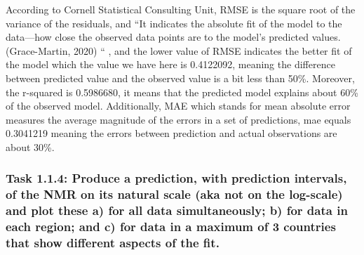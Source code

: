 \documentclass[
]{article}
\begin{document}
According to Cornell Statistical Consulting Unit, RMSE is the square
root of the variance of the residuals, and ``It indicates the absolute
fit of the model to the data---how close the observed data points are to
the model's predicted values. (Grace-Martin, 2020) `` , and the lower
value of RMSE indicates the better fit of the model which the value we
have here is 0.4122092, meaning the difference between predicted value
and the observed value is a bit less than 50\%. Moreover, the r-squared
is 0.5986680, it means that the predicted model explains about 60\% of
the observed model. Additionally, MAE which stands for mean absolute
error measures the average magnitude of the errors in a set of
predictions, mae equals 0.3041219 meaning the errors between prediction
and actual observations are about 30\%.

\hypertarget{task-1.1.4-produce-a-prediction-with-prediction-intervals-of-the-nmr-on-its-natural-scale-aka-not-on-the-log-scale-and-plot-these-a-for-all-data-simultaneously-b-for-data-in-each-region-and-c-for-data-in-a-maximum-of-3-countries-that-show-different-aspects-of-the-fit.}{%
\subsubsection{Task 1.1.4: Produce a prediction, with prediction
intervals, of the NMR on its natural scale (aka not on the log-scale)
and plot these a) for all data simultaneously; b) for data in each
region; and c) for data in a maximum of 3 countries that show different
aspects of the
fit.}\label{task-1.1.4-produce-a-prediction-with-prediction-intervals-of-the-nmr-on-its-natural-scale-aka-not-on-the-log-scale-and-plot-these-a-for-all-data-simultaneously-b-for-data-in-each-region-and-c-for-data-in-a-maximum-of-3-countries-that-show-different-aspects-of-the-fit.}}
\end{document}
